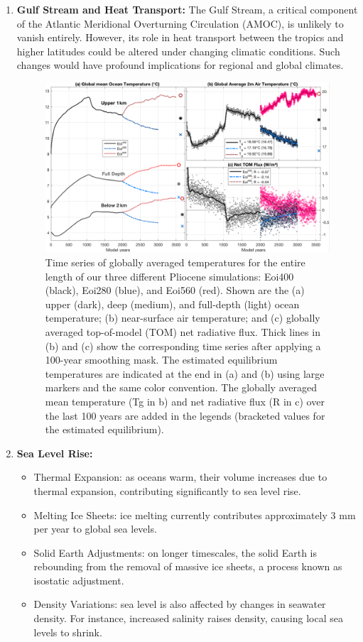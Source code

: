 \begin{enumerate}
    \item \textbf{Gulf Stream and Heat Transport:} The Gulf Stream, a critical component of the Atlantic Meridional Overturning Circulation (AMOC), is unlikely to vanish entirely. However, its role in heat transport between the tropics and higher latitudes could be altered under changing climatic conditions. Such changes would have profound implications for regional and global climates.
\begin{figure}[htpb]
    \centering
    \includegraphics[width=0.5\linewidth]{uploads/temperature.png}
    \caption{Time series of globally averaged temperatures for the entire length of our three different Pliocene simulations: Eoi400 (black), Eoi280 (blue), and Eoi560 (red). Shown are the (a) upper (dark), deep (medium), and full-depth (light) ocean temperature; (b) near-surface air temperature; and (c) globally averaged top-of-model (TOM) net radiative flux. Thick lines in (b) and (c) show the corresponding time series after applying a 100-year smoothing mask. The estimated equilibrium temperatures are indicated at the end in (a) and (b) using large markers and the same color convention. The globally averaged mean temperature (Tg in b) and net radiative flux (R in c) over the last 100 years are added in the legends (bracketed values for the estimated equilibrium). }
    \label{fig:temperature}
\end{figure}
    \item \textbf{Sea Level Rise:}
    \begin{itemize}
        \item Thermal Expansion: as oceans warm, their volume increases due to thermal expansion, contributing significantly to sea level rise.
        \item Melting Ice Sheets: ice melting currently contributes approximately 3 mm per year to global sea levels.
        \item Solid Earth Adjustments: on longer timescales, the solid Earth is rebounding from the removal of massive ice sheets, a process known as isostatic adjustment.
        \item Density Variations: sea level is also affected by changes in seawater density. For instance, increased salinity raises density, causing local sea levels to shrink.

\end{itemize}
\end{enumerate}
